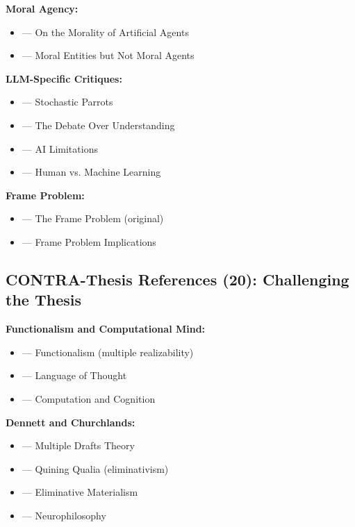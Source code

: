 \textbf{Moral Agency:}
\begin{itemize}[nosep]
    \item \citet{floridi2004morality} --- On the Morality of Artificial Agents
    \item \citet{johnson2006computer} --- Moral Entities but Not Moral Agents
\end{itemize}

\textbf{LLM-Specific Critiques:}
\begin{itemize}[nosep]
    \item \citet{bender2021dangers} --- Stochastic Parrots
    \item \citet{mitchell2023debate} --- The Debate Over Understanding
    \item \citet{marcus2020next} --- AI Limitations
    \item \citet{lake2017building} --- Human vs. Machine Learning
\end{itemize}

\textbf{Frame Problem:}
\begin{itemize}[nosep]
    \item \citet{mccarthy1981some} --- The Frame Problem (original)
    \item \citet{fodor1987modules} --- Frame Problem Implications
\end{itemize}


\subsection{CONTRA-Thesis References (20): Challenging the Thesis}

\textbf{Functionalism and Computational Mind:}
\begin{itemize}[nosep]
    \item \citet{putnam1967psychological} --- Functionalism (multiple realizability)
    \item \citet{fodor1975language} --- Language of Thought
    \item \citet{pylyshyn1984computation} --- Computation and Cognition
\end{itemize}

\textbf{Dennett and Churchlands:}
\begin{itemize}[nosep]
    \item \citet{dennett1991consciousness} --- Multiple Drafts Theory
    \item \citet{dennett1988quining} --- Quining Qualia (eliminativism)
    \item \citet{churchland1981eliminative} --- Eliminative Materialism
    \item \citet{churchland1986neurophilosophy} --- Neurophilosophy
\end{itemize}

